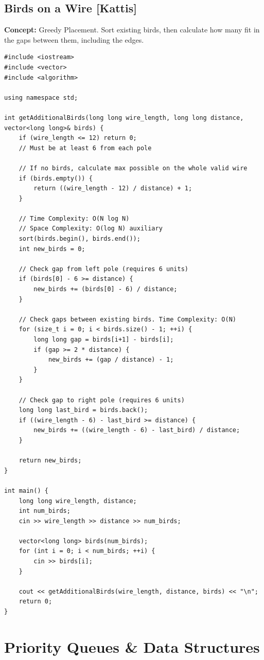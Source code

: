 \subsection{Birds on a Wire [Kattis]}
\textbf{Concept:} Greedy Placement. Sort existing birds, then calculate how many fit in the gaps between them, including the edges.
\begin{lstlisting}
#include <iostream>
#include <vector>
#include <algorithm>

using namespace std;

int getAdditionalBirds(long long wire_length, long long distance, vector<long long>& birds) {
    if (wire_length <= 12) return 0;
    // Must be at least 6 from each pole
    
    // If no birds, calculate max possible on the whole valid wire
    if (birds.empty()) {
        return ((wire_length - 12) / distance) + 1;
    }
    
    // Time Complexity: O(N log N)
    // Space Complexity: O(log N) auxiliary
    sort(birds.begin(), birds.end());
    int new_birds = 0;
    
    // Check gap from left pole (requires 6 units)
    if (birds[0] - 6 >= distance) {
        new_birds += (birds[0] - 6) / distance;
    }
    
    // Check gaps between existing birds. Time Complexity: O(N)
    for (size_t i = 0; i < birds.size() - 1; ++i) {
        long long gap = birds[i+1] - birds[i];
        if (gap >= 2 * distance) {
            new_birds += (gap / distance) - 1;
        }
    }
    
    // Check gap to right pole (requires 6 units)
    long long last_bird = birds.back();
    if ((wire_length - 6) - last_bird >= distance) {
        new_birds += ((wire_length - 6) - last_bird) / distance;
    }
    
    return new_birds;
}

int main() {
    long long wire_length, distance;
    int num_birds;
    cin >> wire_length >> distance >> num_birds;
    
    vector<long long> birds(num_birds);
    for (int i = 0; i < num_birds; ++i) {
        cin >> birds[i];
    }
    
    cout << getAdditionalBirds(wire_length, distance, birds) << "\n";
    return 0;
}
\end{lstlisting}


\section{Priority Queues \& Data Structures}

